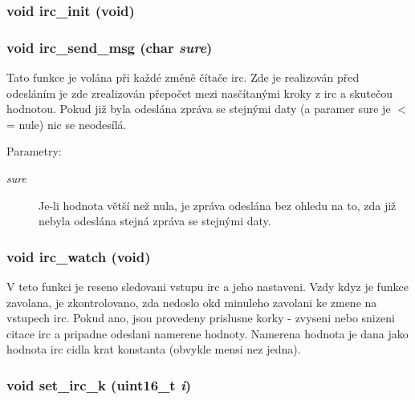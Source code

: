 \subsubsection{\setlength{\rightskip}{0pt plus 5cm}void irc\_\-init (void)}\label{irc_8h_22c4d40478e2da08e616d92de5442378}


\subsubsection{\setlength{\rightskip}{0pt plus 5cm}void irc\_\-send\_\-msg (char {\em sure})}\label{irc_8h_2b23a703e44cfe694de1e8ad0e054638}


Tato funkce je volána při každé změně čítače irc. Zde je realizován před odesláním je zde zrealizován přepočet mezi nasčítanými kroky z irc a skutečou hodnotou. Pokud již byla odeslána zpráva se stejnými daty (a paramer sure je $<$= nule) nic se neodesílá. \begin{Desc}
\item[Parametry:]
\begin{description}
\item[{\em sure}]Je-li hodnota větší než nula, je zpráva odeslána bez ohledu na to, zda již nebyla odeslána stejná zpráva se stejnými daty. \end{description}
\end{Desc}
\subsubsection{\setlength{\rightskip}{0pt plus 5cm}void irc\_\-watch (void)}\label{irc_8h_bcea345e2f5f79d052b85a22d51ad123}


V teto funkci je reseno sledovani vstupu irc a jeho nastaveni. Vzdy kdyz je funkce zavolana, je zkontrolovano, zda nedoslo okd minuleho zavolani ke zmene na vstupech irc. Pokud ano, jsou provedeny prislusne korky - zvyseni nebo snizeni citace irc a pripadne odeslani namerene hodnoty. Namerena hodnota je dana jako hodnota irc cidla krat konstanta (obvykle mensi nez jedna). 
\subsubsection{\setlength{\rightskip}{0pt plus 5cm}void set\_\-irc\_\-k (uint16\_\-t {\em i})}\label{irc_8h_449f740513ef32944b53ceb5e64c7530}


